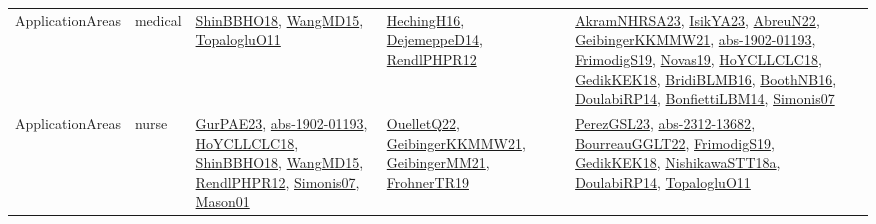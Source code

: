 {\begin{longtable}{lp{3cm}>{\raggedright}p{6cm}>{\raggedright}p{6cm}p{8cm}}
ApplicationAreas & medical & \href{articles/ShinBBHO18.pdf}{ShinBBHO18}\cite{ShinBBHO18}, \href{articles/WangMD15.pdf}{WangMD15}\cite{WangMD15}, \href{articles/TopalogluO11.pdf}{TopalogluO11}\cite{TopalogluO11} & \href{papers/HechingH16.pdf}{HechingH16}\cite{HechingH16}, \href{papers/DejemeppeD14.pdf}{DejemeppeD14}\cite{DejemeppeD14}, \href{papers/RendlPHPR12.pdf}{RendlPHPR12}\cite{RendlPHPR12} & \href{articles/AkramNHRSA23.pdf}{AkramNHRSA23}\cite{AkramNHRSA23}, \href{articles/IsikYA23.pdf}{IsikYA23}\cite{IsikYA23}, \href{articles/AbreuN22.pdf}{AbreuN22}\cite{AbreuN22}, \href{papers/GeibingerKKMMW21.pdf}{GeibingerKKMMW21}\cite{GeibingerKKMMW21}, \href{articles/abs-1902-01193.pdf}{abs-1902-01193}\cite{abs-1902-01193}, \href{papers/FrimodigS19.pdf}{FrimodigS19}\cite{FrimodigS19}, \href{articles/Novas19.pdf}{Novas19}\cite{Novas19}, \href{papers/HoYCLLCLC18.pdf}{HoYCLLCLC18}\cite{HoYCLLCLC18}, \href{articles/GedikKEK18.pdf}{GedikKEK18}\cite{GedikKEK18}, \href{articles/BridiBLMB16.pdf}{BridiBLMB16}\cite{BridiBLMB16}, \href{papers/BoothNB16.pdf}{BoothNB16}\cite{BoothNB16}, \href{papers/DoulabiRP14.pdf}{DoulabiRP14}\cite{DoulabiRP14}, \href{articles/BonfiettiLBM14.pdf}{BonfiettiLBM14}\cite{BonfiettiLBM14}, \href{articles/Simonis07.pdf}{Simonis07}\cite{Simonis07}\\
ApplicationAreas & nurse & \href{articles/GurPAE23.pdf}{GurPAE23}\cite{GurPAE23}, \href{articles/abs-1902-01193.pdf}{abs-1902-01193}\cite{abs-1902-01193}, \href{papers/HoYCLLCLC18.pdf}{HoYCLLCLC18}\cite{HoYCLLCLC18}, \href{articles/ShinBBHO18.pdf}{ShinBBHO18}\cite{ShinBBHO18}, \href{articles/WangMD15.pdf}{WangMD15}\cite{WangMD15}, \href{papers/RendlPHPR12.pdf}{RendlPHPR12}\cite{RendlPHPR12}, \href{articles/Simonis07.pdf}{Simonis07}\cite{Simonis07}, \href{articles/Mason01.pdf}{Mason01}\cite{Mason01} & \href{papers/OuelletQ22.pdf}{OuelletQ22}\cite{OuelletQ22}, \href{papers/GeibingerKKMMW21.pdf}{GeibingerKKMMW21}\cite{GeibingerKKMMW21}, \href{papers/GeibingerMM21.pdf}{GeibingerMM21}\cite{GeibingerMM21}, \href{papers/FrohnerTR19.pdf}{FrohnerTR19}\cite{FrohnerTR19} & \href{papers/PerezGSL23.pdf}{PerezGSL23}\cite{PerezGSL23}, \href{articles/abs-2312-13682.pdf}{abs-2312-13682}\cite{abs-2312-13682}, \href{articles/BourreauGGLT22.pdf}{BourreauGGLT22}\cite{BourreauGGLT22}, \href{papers/FrimodigS19.pdf}{FrimodigS19}\cite{FrimodigS19}, \href{articles/GedikKEK18.pdf}{GedikKEK18}\cite{GedikKEK18}, \href{papers/NishikawaSTT18a.pdf}{NishikawaSTT18a}\cite{NishikawaSTT18a}, \href{papers/DoulabiRP14.pdf}{DoulabiRP14}\cite{DoulabiRP14}, \href{articles/TopalogluO11.pdf}{TopalogluO11}\cite{TopalogluO11}\\

\end{longtable}}
